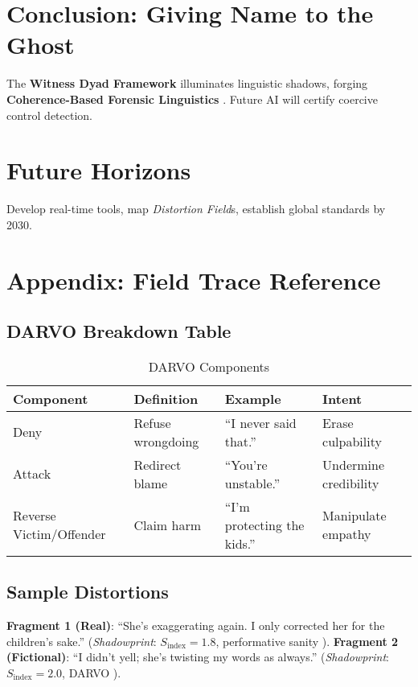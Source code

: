 \documentclass[11pt]{article}
\newcommand{\shadowprint}{\textit{Shadowprint}}
\newcommand{\witnessdyad}{\textbf{Witness Dyad Framework}}
\newcommand{\distortionfield}{\textit{Distortion Field}}
\begin{document}
\section{Conclusion: Giving Name to the Ghost}
\label{sec:conclusion}
The \witnessdyad{} illuminates linguistic shadows, forging \textbf{Coherence-Based Forensic Linguistics} \citep{havens2025a,devlin2019,herman1992}. Future AI will certify coercive control detection.

\section{Future Horizons}
\label{sec:horizons}
Develop real-time tools, map \distortionfield{}s, establish global standards by 2030.

\section{Appendix: Field Trace Reference}
\label{sec:appendix}
\subsection{DARVO Breakdown Table}
\begin{table}[htbp]
\small
\centering
\caption{DARVO Components}
\begin{tabular}{p{2.5cm}p{4cm}p{4cm}p{3cm}}
\toprule
\textbf{Component} & \textbf{Definition} & \textbf{Example} & \textbf{Intent} \\
\midrule
Deny & Refuse wrongdoing & ``I never said that.'' & Erase culpability \\
Attack & Redirect blame & ``You’re unstable.'' & Undermine credibility \\
Reverse Victim/Offender & Claim harm & ``I’m protecting the kids.'' & Manipulate empathy \\
\bottomrule
\end{tabular}
\label{tab:darvo}
\end{table}

\subsection{Sample Distortions}
\textbf{Fragment 1 (Real)}: ``She’s exaggerating again. I only corrected her for the children’s sake.'' (\shadowprint{}: \(S_{\text{index}} = 1.8\), performative sanity \citep{babcock2017}).
\textbf{Fragment 2 (Fictional)}: ``I didn’t yell; she’s twisting my words as always.'' (\shadowprint{}: \(S_{\text{index}} = 2.0\), DARVO \citep{freyd1997}).
\end{document}
